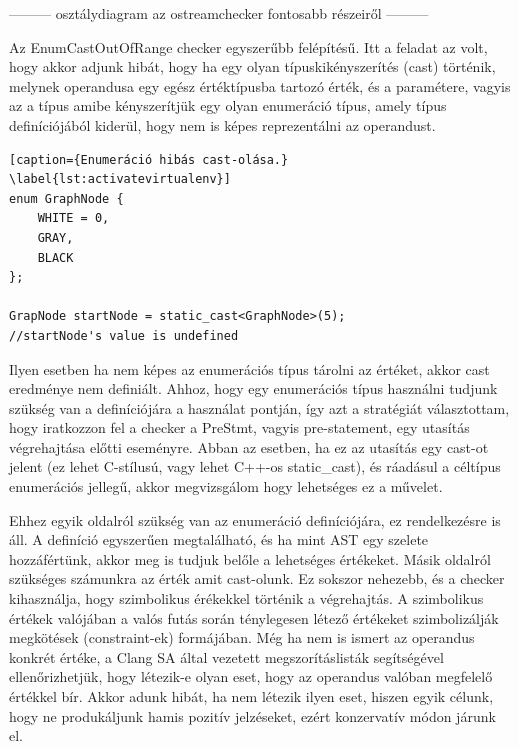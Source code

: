 \documentclass[a4paper,12pt]{report}
\begin{document}
--------- osztálydiagram az ostreamchecker fontosabb részeiről ---------

Az EnumCastOutOfRange checker egyszerűbb felépítésű. Itt a feladat az volt, hogy akkor adjunk hibát, hogy ha egy olyan típuskikényszerítés (cast) történik, melynek operandusa egy egész értéktípusba tartozó érték, és a paramétere, vagyis az a típus amibe kényszerítjük egy olyan enumeráció típus, amely típus definíciójából kiderül, hogy nem is képes reprezentálni az operandust.

\begin{lstlisting}[caption={Enumeráció hibás cast-olása.}
\label{lst:activatevirtualenv}]
enum GraphNode {
	WHITE = 0,
	GRAY,
	BLACK
};

GrapNode startNode = static_cast<GraphNode>(5);
//startNode's value is undefined
\end{lstlisting}

Ilyen esetben ha nem képes az enumerációs típus tárolni az értéket, akkor cast eredménye nem definiált. Ahhoz, hogy egy enumerációs típus használni tudjunk szükség van a definíciójára a használat pontján, így azt a stratégiát választottam, hogy iratkozzon fel a checker a PreStmt, vagyis pre-statement, egy utasítás végrehajtása előtti eseményre. Abban az esetben, ha ez az utasítás egy cast-ot jelent (ez lehet C-stílusú, vagy lehet C++-os static\_cast), és ráadásul a céltípus enumerációs jellegű, akkor megvizsgálom hogy lehetséges ez a művelet.

Ehhez egyik oldalról szükség van az enumeráció definíciójára, ez rendelkezésre is áll. A definíció egyszerűen megtalálható, és ha mint AST egy szelete hozzáfértünk, akkor meg is tudjuk belőle a lehetséges értékeket. Másik oldalról szükséges számunkra az érték amit cast-olunk. Ez sokszor nehezebb, és a checker kihasználja, hogy szimbolikus érékekkel történik a végrehajtás. A szimbolikus értékek valójában a valós futás során ténylegesen létező értékeket szimbolizálják megkötések (constraint-ek) formájában. Még ha nem is ismert az operandus konkrét értéke, a Clang SA által vezetett megszorításlisták segítségével ellenőrizhetjük, hogy létezik-e olyan eset, hogy az operandus valóban megfelelő értékkel bír. Akkor adunk hibát, ha nem létezik ilyen eset, hiszen egyik célunk, hogy ne produkáljunk hamis pozitív jelzéseket, ezért konzervatív módon járunk el.
\end{document}
